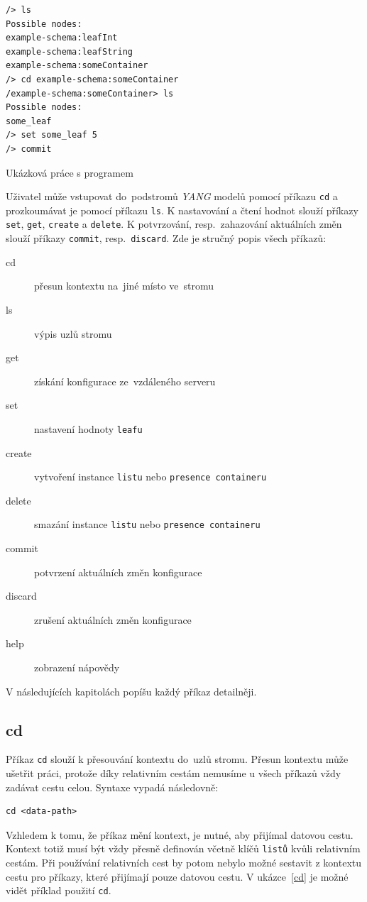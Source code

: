 \documentclass[thesis=B,czech,hidelinks]{FITthesis}[2019/03/06]
\begin{document}
\begin{listing}[H]
\begin{verbatim}
/> ls
Possible nodes:
example-schema:leafInt
example-schema:leafString
example-schema:someContainer
/> cd example-schema:someContainer
/example-schema:someContainer> ls
Possible nodes:
some_leaf
/> set some_leaf 5
/> commit
\end{verbatim}
\caption{Ukázková práce s programem}\label{ukazka:program}
\end{listing}

Uživatel může vstupovat do~podstromů \textit{YANG} modelů pomocí příkazu \texttt{cd} a prozkoumávat je pomocí příkazu \texttt{ls}. K nastavování a čtení hodnot slouží příkazy \texttt{set}, \texttt{get}, \texttt{create} a \texttt{delete}. K potvrzování, resp.\ zahazování aktuálních změn slouží příkazy \texttt{commit}, resp.\ \texttt{discard}. Zde je stručný popis všech příkazů:
\begin{description}
\item[cd]{přesun kontextu na~jiné místo ve~stromu}
\item[ls]{výpis uzlů stromu}
\item[get]{získání konfigurace ze~vzdáleného serveru}
\item[set]{nastavení hodnoty \texttt{leafu}}
\item[create]{vytvoření instance \texttt{listu} nebo \texttt{presence containeru}}
\item[delete]{smazání instance \texttt{listu} nebo \texttt{presence containeru}}
\item[commit]{potvrzení aktuálních změn konfigurace}
\item[discard]{zrušení aktuálních změn konfigurace}
\item[help]{zobrazení nápovědy}
\end{description}

V následujících kapitolách popíšu každý příkaz detailněji.

\subsection{cd}
Příkaz \texttt{cd} slouží k přesouvání kontextu do~uzlů stromu. Přesun kontextu může ušetřit práci, protože díky relativním cestám nemusíme u všech příkazů vždy zadávat cestu celou. Syntaxe vypadá následovně:
\begin{verbatim}
cd <data-path>
\end{verbatim}
Vzhledem k tomu, že příkaz mění kontext, je nutné, aby přijímal datovou cestu. Kontext totiž musí být vždy přesně definován včetně klíčů \texttt{listů} kvůli relativním cestám. Při používání relativních cest by potom nebylo možné sestavit z kontextu cestu pro příkazy, které přijímají pouze datovou cestu. V ukázce~\ref{cd} je možné vidět příklad použití \texttt{cd}.
\end{document}
